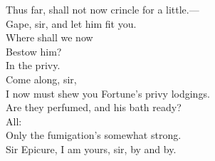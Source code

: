 \documentclass[a4paper,oneside]{memoir}
\begin{document}
\begin{drama*}
Thus far, shall not now crincle for a little.---\\
Gape, sir, and let him fit you.\\
\subtlespeaks {} Where shall we now\\
Bestow him?\\
\dolspeaks {} In the privy.\\
\subtlespeaks {} Come along, sir,\\
I now must shew you Fortune's privy lodgings.\\
\facespeaks Are they perfumed, and his bath ready?\\
\subtlespeaks {} All:\\
Only the fumigation's somewhat strong.\\
\facespeaks {}
Sir Epicure, I am yours, sir, by and by.\\
\act

\scene


\end{drama*}
\end{document}

